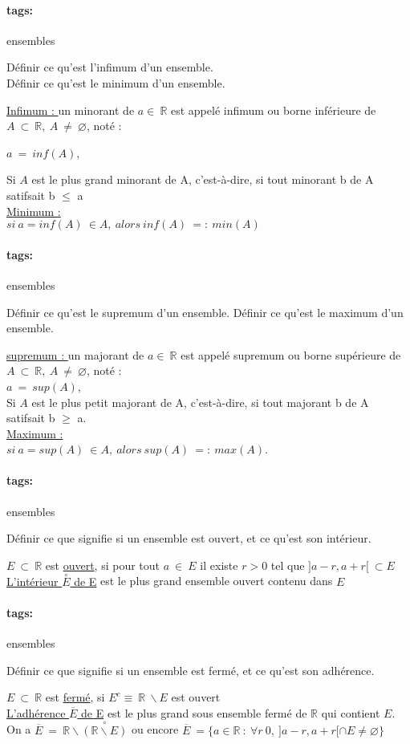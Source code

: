 \documentclass[12pt]{article}
\newcommand*{\xfield}[1]{\begin{mdframed}\centering #1\end{mdframed}\bigskip}
\newenvironment{note}{}{}
\newcommand*{\tags}[1]{\paragraph{tags: }#1}
\begin{document}
\begin{note}
	\tags{ensembles}
    \xfield{
        Définir ce qu'est l'infimum d'un ensemble.\\
        Définir ce qu'est le minimum d'un ensemble.\\
    }
    \xfield{
        \underline{Infimum : } un minorant de $a \in\ \mathbb{R}$ est appelé infimum ou borne inférieure de $A\ \subset\ \mathbb{R},\ A\ \neq\ \varnothing$, noté :\\        
        \begin{center}
              $a\ =\ inf(A)$,\\
        \end{center}
        Si $A$ est le plus grand minorant de A, c'est-à-dire, si tout minorant b de A satifsait b $\le$ a\\    
        \underline{Minimum : }\\
        $si\ a=inf(A)\ \in A,\ alors\ inf(A)\ =:\ min(A)$ }
\end{note}

\begin{note}
	\tags{ensembles}
    \xfield{
        Définir ce qu'est le supremum d'un ensemble.
        Définir ce qu'est le maximum d'un ensemble.
    }
    \xfield{
        \underline{supremum : } un majorant de $a \in\ \mathbb{R}$ est appelé supremum ou borne supérieure de $A\ \subset\ \mathbb{R},\ A\ \neq\ \varnothing$, noté : \\
                $a\ =\ sup(A)$,\\
        Si $A$ est le plus petit majorant de A, c'est-à-dire, si tout majorant b de A satifsait b $\ge$ a.\\        
        \underline{Maximum : }\\
        $si\ a=sup(A)\ \in A,\ alors\ sup(A)\ =:\ max(A)$.
    }
\end{note}

\begin{note}
	\tags{ensembles}
    \xfield{Définir ce que signifie si un ensemble est ouvert, et ce qu'est son intérieur.}
    \xfield{
        $E\ \subset\ \mathbb{R}$ est \underline{ouvert}, si pour tout $a\ \in\ E$ il existe $r >0$ tel que $] a-r, a+r [\ \subset E$\\
                \underline{L'intérieur $\overset{\circ}{E}$ de E} est le plus grand ensemble ouvert contenu dans $E$
    }
\end{note}

\begin{note}
	\tags{ensembles}
    \xfield{
        Définir ce que signifie si un ensemble est fermé, et ce qu'est son adhérence.
    }
    \xfield{
        $E\ \subset\ \mathbb{R}$ est \underline{fermé}, si $E^c \equiv\ \mathbb{R}\ \backslash E$ est ouvert\\
        \underline{L'adhérence $\overline{E}$ de E} est le plus grand sous ensemble fermé de $\mathbb{R}$ qui contient $E$. \\
        On a $\overline{E}\ =\ \mathbb{R}\backslash \overset{\circ}{(\mathbb{R}\backslash E)}$ ou encore $\overline{E}\ = \{ a \in \mathbb{R}\ :\ \forall r \> 0,\ ] a-r, a+r[ \cap E \neq \varnothing\} $
    }
\end{note}
\end{document}
